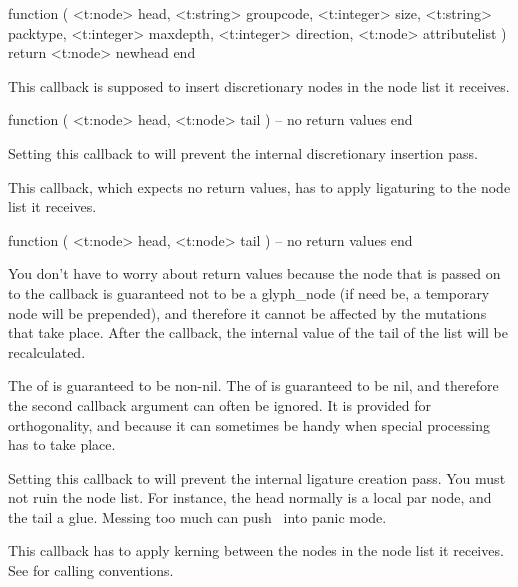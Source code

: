 \starttyping[option=LUA]
function (
    <t:node>    head,
    <t:string>  groupcode,
    <t:integer> size,
    <t:string>  packtype,
    <t:integer> maxdepth,
    <t:integer> direction,
    <t:node>    attributelist
)
    return <t:node> newhead
end
\stoptyping

\stopsubsection

\startsubsection[title=hyphenate]

This callback is supposed to insert discretionary nodes in the node list it
receives.

\starttyping[option=LUA]
function (
    <t:node> head,
    <t:node> tail
)
    -- no return values
end
\stoptyping

Setting this callback to  will prevent the internal discretionary
insertion pass.

\stopsubsection

\startsubsection[title=ligaturing]

This callback, which expects no return values, has to apply ligaturing to the
node list it receives.

\starttyping[option=LUA]
function (
    <t:node> head,
    <t:node> tail
)
    -- no return values
end
\stoptyping

You don't have to worry about return values because the  node that is
passed on to the callback is guaranteed not to be a glyph_node (if need be, a
temporary node will be prepended), and therefore it cannot be affected by the
mutations that take place. After the callback, the internal value of the \quote
{tail of the list} will be recalculated.

The  of  is guaranteed to be non-nil. The  of
 is guaranteed to be nil, and therefore the second callback argument
can often be ignored. It is provided for orthogonality, and because it can
sometimes be handy when special processing has to take place.

Setting this callback to  will prevent the internal ligature
creation pass. You must not ruin the node list. For instance, the head normally
is a local par node, and the tail a glue. Messing too much can push \LUATEX\ into
panic mode.

\stopsubsection

\startsubsection[title=kerning]

This callback has to apply kerning between the nodes in the node list it
receives. See  for calling conventions.

